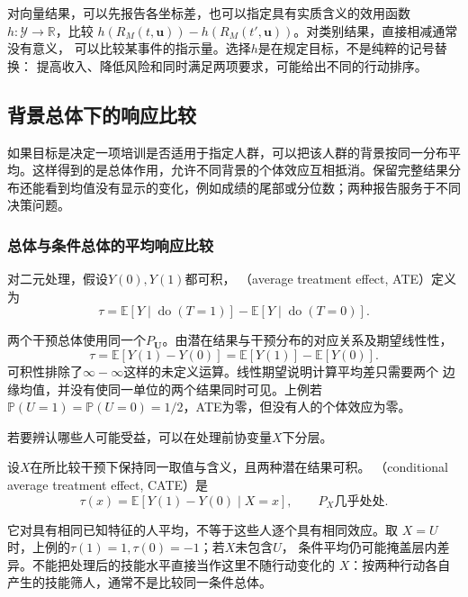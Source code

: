 对向量结果，可以先报告各坐标差，也可以指定具有实质含义的效用函数
\(h:\mathcal Y\to\mathbb R\)，比较
\(h(R_M(t,\bm u))-h(R_M(t',\bm u))\)。对类别结果，直接相减通常没有意义，
可以比较某事件的指示量。选择\(h\)是在规定目标，不是纯粹的记号替换：
提高收入、降低风险和同时满足两项要求，可能给出不同的行动排序。

\subsection{背景总体下的响应比较}
\label{sec:causal-population-response}

如果目标是决定一项培训是否适用于指定人群，可以把该人群的背景按同一分布平均。这样得到的是总体作用，允许不同背景的个体效应互相抵消。保留完整结果分布还能看到均值没有显示的变化，例如成绩的尾部或分位数；两种报告服务于不同决策问题。

\subsubsection{总体与条件总体的平均响应比较}
\label{sec:causal-average-response}

\begin{definition}[平均处理效应]
  \label{def:causal-average-treatment-effect}
  对二元处理，假设\(Y(0),Y(1)\)都可积，
  （average treatment effect, ATE）定义为
  \begin{equation}
    \tau
    =
    \mathbb E[Y\mid\operatorname{do}(T=1)]
    -
    \mathbb E[Y\mid\operatorname{do}(T=0)].
    \label{eq:causal-ate-interventional}
  \end{equation}
\end{definition}

两个干预总体使用同一个\(P_{\bm U}\)。由潜在结果与干预分布的对应关系及期望线性性，
\begin{equation}
  \tau
  =\mathbb E[Y(1)-Y(0)]
  =\mathbb E[Y(1)]-\mathbb E[Y(0)].
  \label{eq:causal-ate-potential-outcomes}
\end{equation}
可积性排除了\(\infty-\infty\)这样的未定义运算。线性期望说明计算平均差只需要两个
边缘均值，并没有使同一单位的两个结果同时可见。上例若
\(\mathbb P(U=1)=\mathbb P(U=0)=1/2\)，ATE为零，但没有人的个体效应为零。

若要辨认哪些人可能受益，可以在处理前协变量\(X\)下分层。
\begin{definition}[条件平均处理效应]
  \label{def:causal-conditional-average-effect}
  设\(X\)在所比较干预下保持同一取值与含义，且两种潜在结果可积。
  （conditional average treatment effect, CATE）是
  \begin{equation}
    \tau(x)=\mathbb E[Y(1)-Y(0)\mid X=x],
    \qquad P_X\text{几乎处处}.
    \label{eq:causal-cate}
  \end{equation}
\end{definition}
它对具有相同已知特征的人平均，不等于这些人逐个具有相同效应。取
\(X=U\)时，上例的\(\tau(1)=1,\tau(0)=-1\)；若\(X\)未包含\(U\)，
条件平均仍可能掩盖层内差异。不能把处理后的技能水平直接当作这里不随行动变化的
\(X\)：按两种行动各自产生的技能筛人，通常不是比较同一条件总体。

